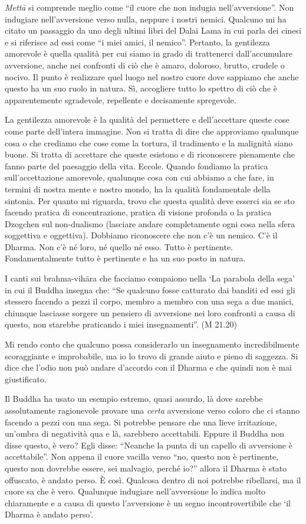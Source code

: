 \textit{Mettā} si comprende meglio come ``il cuore che non indugia nell'avversione''. Non indugiare nell'avversione verso nulla, neppure i nostri nemici. Qualcuno mi ha citato un passaggio da uno degli ultimi libri del Dalai Lama in cui parla dei cinesi e si riferisce ad essi come ``i miei amici, il nemico''. Pertanto, la gentilezza amorevole è quella qualità per cui siamo in grado di trattenerci dall'accumulare avversione, anche nei confronti di ciò che è amaro, doloroso, brutto, crudele o nocivo. Il punto è realizzare quel luogo nel nostro cuore dove sappiamo che anche questo ha un suo ruolo in natura. Sì, accogliere tutto lo spettro di ciò che è apparentemente sgradevole, repellente e decisamente spregevole.

La gentilezza amorevole è la qualità del permettere e dell'accettare queste cose come parte dell'intera immagine. Non si tratta di dire che approviamo qualunque cosa o che crediamo che cose come la tortura, il tradimento e la malignità siano buone. Si tratta di accettare che queste esistono e di riconoscere pienamente che fanno parte del paesaggio della vita. Eccole. Quando fondiamo la pratica sull'accettazione amorevole, qualunque cosa con cui abbiamo a che fare, in termini di nostra mente e nostro mondo, ha la qualità fondamentale della sintonia. Per quanto mi riguarda, trovo che questa qualità deve esserci sia se sto facendo pratica di concentrazione, pratica di visione profonda o la pratica Dzogchen sul non-dualismo (lasciare andare completamente ogni cosa nella sfera soggettiva e oggettiva). Dobbiamo riconoscere che non c'è un nemico. C'è il Dharma. Non c'è né loro, né quello né esso. Tutto è pertinente. Fondamentalmente tutto è pertinente e ha un suo posto in natura. 

I canti sui brahma-vihāra che facciamo compaiono nella `La parabola della sega' in cui il Buddha insegna che: ``Se qualcuno fosse catturato dai banditi ed essi gli stessero facendo a pezzi il corpo, membro a membro con una sega a due manici, chiunque lasciasse sorgere un pensiero di avversione nei loro confronti a causa di questo, non starebbe praticando i miei insegnamenti''. (M 21.20)

Mi rendo conto che qualcuno possa considerarlo un insegnamento incredibilmente scoraggiante e improbabile, ma io lo trovo di grande aiuto e pieno di saggezza. Si dice che l'odio non può andare d'accordo con il Dharma e che quindi non è mai giustificato.

Il Buddha ha usato un esempio estremo, quasi assurdo, là dove sarebbe assolutamente ragionevole provare una \textit{certa} avversione verso coloro che ci stanno facendo a pezzi con una sega. Si potrebbe pensare che una lieve irritazione, un'ombra di negatività qua e là, sarebbero accettabili. Eppure il Buddha non disse questo, è vero? Egli disse: ``Neanche la punta di un capello di avversione è accettabile''. Non appena il cuore vacilla verso ``no, questo non è pertinente, questo non dovrebbe essere, sei malvagio, perché io?'' allora il Dharma è stato offuscato, è andato perso. È così. Qualcosa dentro di noi potrebbe ribellarsi, ma il cuore sa che è vero. Qualunque indugiare nell'avversione lo indica molto chiaramente e a causa di questo l'avversione è un segno incontrovertibile che `il Dharma è andato perso'.

